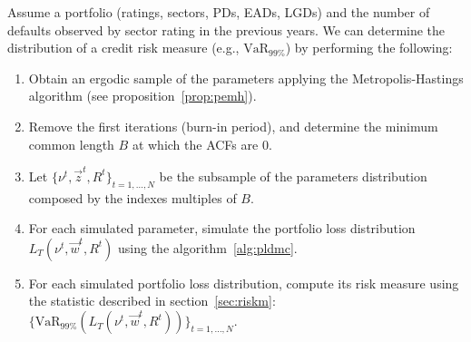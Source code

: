 \documentclass[11pt,fleqn]{book} %
\begin{document}
\begin{algorithm}
	\label{alg:crmd}
	Assume a portfolio (ratings, sectors, PDs, EADs, LGDs) and the number 
	of defaults observed by sector rating in the previous years. We can
	determine the distribution of a credit risk measure 
	(e.g., $\text{VaR}_{99\%}$) by performing the following:
	\begin{enumerate}
		\item Obtain an ergodic sample of the parameters applying the
		Metropolis-Hastings algorithm (see proposition~\ref{prop:pemh}).
		\item Remove the first iterations (burn-in period), and determine
		the minimum common length $B$ at which the ACFs are $0$.
		\item Let $\{\nu^t, \vec{z}^t, R^t\}_{t=1,\dots,N}$ be the subsample
		of the parameters distribution composed by the indexes multiples 
		of $B$.
		\item For each simulated parameter, simulate the portfolio loss 
		distribution $L_T(\nu^t,\vec{w}^t,R^t)$ using the algorithm~\ref{alg:pldmc}.
		\item For each simulated portfolio loss distribution, compute its 
		risk measure using the statistic described in section~\ref{sec:riskm}:
		$\{\text{VaR}_{99\%}(L_T(\nu^t,\vec{w}^t,R^t))\}_{t=1,\dots,N}$.
	\end{enumerate}
\end{algorithm}
\end{document}
